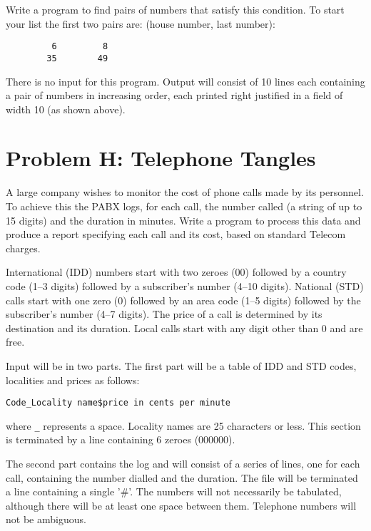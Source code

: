 Write a program to find pairs of numbers that satisfy this condition.
To start your list the first two pairs are: (house number, last number):

\begin{verbatim}
         6         8
        35        49
\end{verbatim}

There is no input for this program.  Output will consist of 10 lines
each containing a pair of numbers in increasing order,
each printed right justified in a field of width 10 (as shown above).

\newpage

\section*{Problem H: Telephone Tangles}

A large company wishes to monitor the cost of phone calls made by its
personnel.  To achieve this the PABX logs, for each call, the number
called (a string of up to 15 digits) and the duration in minutes.
Write a program to process this data and produce a report specifying
each call and its cost, based on standard Telecom charges.

International (IDD) numbers start with two zeroes (00) followed by a country
code (1--3 digits) followed by a subscriber's number (4--10 digits).
National (STD) calls start with one zero (0) followed by an area code
(1--5 digits) followed by the subscriber's number (4--7 digits).  The
price of a call is determined by its destination and its duration.
Local calls start with any digit other than 0 and are free.

Input will be in two parts.  The first part will be a table of IDD and STD
codes, localities and prices as follows:

\begin{verbatim}
Code_Locality name$price in cents per minute
\end{verbatim}

where \verb|_| represents a space.  Locality names are 25 characters
or less.  This section is terminated by a line containing 6 zeroes (000000).

The second part contains the log and will consist of a series of
lines, one for each call, containing the number dialled and the
duration.  The file will be terminated a line containing a single '\#'.
The numbers will not necessarily be tabulated, although there will be
at least one space between them.  Telephone numbers will not be
ambiguous.

